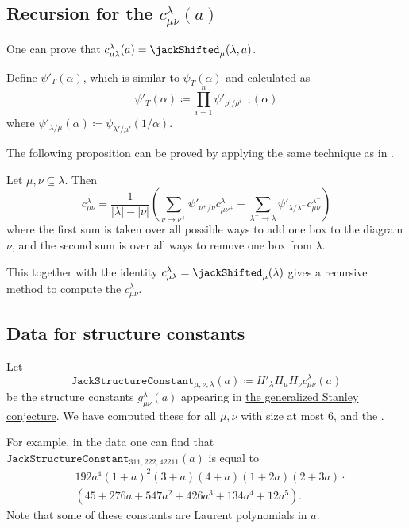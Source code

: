 \subsection[jackShiftedLittlewoodRichardsonFormula]{Recursion for the $c^{\lambda}_{\mu\nu}(a)$}

One can prove that $c^{\lambda}_{\mu\lambda}(a) = \jackShifted_\mu(\lambda,a)$.


Define $\psi'_T(\alpha)$, which is similar to $\psi_T(\alpha)$ and calculated as
\begin{equation*}
\psi'_T(\alpha) \coloneqq \prod_{i=1}^n \psi'_{\rho^i/\rho^{i-1}}(\alpha)
\end{equation*}
where $\psi'_{\lambda/\mu}(\alpha) \coloneqq \psi_{\lambda'/\mu'}(1/\alpha)$.

The following proposition can be proved by applying the same technique as in \cite{MolevSagan1999}.
\begin{proposition}
Let $\mu, \nu \subseteq \lambda$. Then
\begin{equation*}
c^{\lambda}_{\mu\nu} = 
\frac{1}{|\lambda|-|\nu|}\left( 
 \sum_{\nu \to \nu^+} \psi'_{\nu^+ / \nu} c^{\lambda}_{\mu \nu^+} -
 \sum_{\lambda^- \to \lambda } \psi'_{\lambda / \lambda^-} c^{\lambda^-}_{\mu \nu}
\right)
\end{equation*}
where the first sum is taken over all possible ways to add one box to the diagram $\nu$,
and the second sum is over all ways to remove one box from $\lambda$.
\end{proposition}
This together with the identity $c^{\lambda}_{\mu \lambda} = \jackShifted_\mu(\lambda)$
gives a recursive method to compute the $c^{\lambda}_{\mu\nu}$.

\subsection[jackShiftedLittlewoodRichardsonData]{Data for structure constants}

Let
\[
\mathtt{JackStructureConstant}_{\mu,\nu,\lambda}(a)
\coloneqq H'_\lambda H_\mu H_\nu c^{\lambda}_{\mu\nu}(a)
\]
be the structure constants $g^{\lambda}_{\mu \nu}(a)$ appearing
in \hyperref[jackShiftedLittlewoodRichardsonConjecture]{the generalized Stanley conjecture}.
We have computed these for all $\mu,\nu$ with size at most $6$, and the
.

For example, in the data one can find that
$\mathtt{JackStructureConstant}_{311,222,42211}(a)$ is equal to
\begin{align}
& 192a^4(1 + a)^2(3 + a)(4 + a)(1 + 2a)(2 + 3a) \cdot \\
& (45 + 276a + 547a^2 + 426a^3 + 134a^4 + 12a^5).
\end{align}
Note that some of these constants are Laurent polynomials in $a$.
